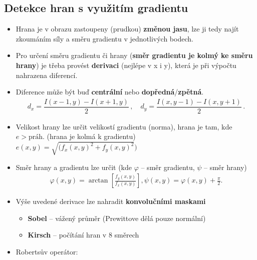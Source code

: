\subsection{Detekce hran s využitím gradientu}
\begin{itemize}
    \item Hrana je v obrazu zastoupeny (prudkou) \textbf{změnou jasu}, lze ji tedy najít zkoumáním síly a směru gradientu v jednotlivých bodech.
    \item Pro určení směru gradientu či hrany (​\textbf{směr gradientu je kolmý ke směru hrany​}) je třeba provést ​ \textbf{derivaci​} (nejlépe v x i y), která je při výpočtu nahrazena diferencí.
    \item Diference může být buď \textbf{centrální} nebo \textbf{dopředná}/\textbf{zpětná}.
          \begin{equation*}
              \begin{split}
                  d_x = \dfrac{I(x - 1, y) - I(x + 1, y)}{2} \, , \quad 		d_y= \dfrac{I(x, y - 1) - I(x, y + 1)}{2} \, .
              \end{split}
          \end{equation*}
    \item Velikost hrany lze určit velikostí gradientu (norma), hrana je tam, kde $e > \textrm{práh}$. (hrana je kolmá k gradientu) \\
          $ e(x, y) = \sqrt{(f_x(x,y)^2+ f_y(x,y)^2})$
    \item Směr hrany a gradientu lze určit (kde $\varphi$ -- směr gradientu, $\psi$ -- směr hrany)
          \begin{equation*}
              \begin{array}{c}
                  \varphi(x, y) = \arctan{[\frac{f_y(x,y)}{f_x(x,y)}]}, \psi(x,y) = \varphi(x,y) + \frac{\pi}{2}.
              \end{array}
          \end{equation*}
    \item Výše uvedené derivace lze nahradit \textbf{konvolučními maskami}
          \begin{itemize}
              \item \textbf{Sobel} -- vážený průměr (Prewittove dělá pouze normální)
              \item \textbf{Kirsch} -- počítání hran v 8 směrech
          \end{itemize}
    \item Robertsův operátor:
          \begin{equation*}

\end{equation*}
\end{itemize}
